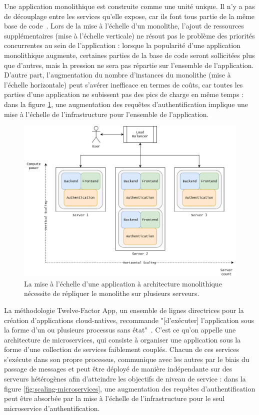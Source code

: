 Une application monolithique est construite comme une unité unique. Il n'y a pas de découplage entre les services qu'elle expose, car ils font tous partie de la même base de code~\cite{villamizarEvaluatingMonolithicMicroservice2015}. Lors de la mise à l'échelle d'un monolithe, l'ajout de ressources supplémentaires (mise à l'échelle verticale) ne résout pas le problème des priorités concurrentes au sein de l'application : lorsque la popularité d'une application monolithique augmente, certaines parties de la base de code seront sollicitées plus que d'autres, mais la pression ne sera pas répartie sur l'ensemble de l'application. D'autre part, l'augmentation du nombre d'instances du monolithe (mise à l'échelle horizontale) peut s'avérer inefficace en termes de coûts, car toutes les parties d'une application ne subissent pas des pics de charge en même temps : dans la figure \ref{fig:scaling-monolith}, une augmentation des requêtes d'authentification implique une mise à l'échelle de l'infrastructure pour l'ensemble de l'application.

\begin{figure}[ht]
    \centering
	\includegraphics[width=\textwidth]{3_Chapitre1/figures/scaling-monolith.png}
	\caption{La mise à l'échelle d'une application à architecture monolithique nécessite de répliquer le monolithe sur plusieurs serveurs.}
	\label{fig:scaling-monolith}
\end{figure}

La méthodologie Twelve-Factor App, un ensemble de lignes directrices pour la création d'applications cloud-natives, recommande "[d'exécuter] l'application sous la forme d'un ou plusieurs processus sans état"~\cite{12factor}. C'est ce qu'on appelle une architecture de microservices, qui consiste à organiser une application sous la forme d'une collection de services faiblement couplés. Chacun de ces services s'exécute dans son propre processus, communique avec les autres par le biais du passage de messages et peut être déployé de manière indépendante sur des serveurs hétérogènes afin d'atteindre les objectifs de niveau de service : dans la figure \ref{fig:scaling-microservices}, une augmentation des requêtes d'authentification peut être absorbée par la mise à l'échelle de l'infrastructure pour le seul microservice d'authentification.

